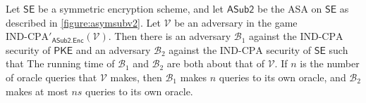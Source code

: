\begin{theorem} \label{theorem:security}
Let $\mathsf{SE}$ be a symmetric encryption scheme, and let $\mathsf{ASub2}$ be the ASA on $\mathsf{SE}$ as described in \autoref{figure:asymsubv2}. Let $\mathcal{V}$ be an adversary in the game $\mathrm{IND}\text{-}\mathrm{CPA}'_{\mathsf{ASub2.Enc}}(\mathcal{V})$. Then there is an adversary $\mathcal{B}_1$ against the $\mathrm{IND}$-$\mathrm{CPA}$ security of $\mathsf{PKE}$ and an adversary $\mathcal{B}_2$ against the $\mathrm{IND}$-$\mathrm{CPA}$ security of $\mathsf{SE}$ such that
The running time of $\mathcal{B}_1$ and $\mathcal{B}_2$ are both about that of $\mathcal{V}$. If $n$ is the number of oracle queries that $\mathcal{V}$ makes, then $\mathcal{B}_1$ makes $n$ queries to its own oracle, and $\mathcal{B}_2$ makes at most $ns$ queries to its own oracle.
\end{theorem}
